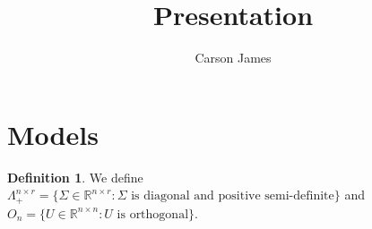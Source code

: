 \documentclass[notheorems]{beamer}
\title{Presentation}
\author{Carson James}
\theoremstyle{definition}
\newtheorem{defn}[definition]{Definition}
\newcommand{\Lam}{\Lambda}
\newcommand{\Sig}{\Sigma}
\newcommand{\R}{\mathbb{R}}
\begin{document}
\frame{\titlepage}


%	


\section{Models}

\begin{frame}
\begin{defn}
We define $\Lam^{n \times r}_+ = \{\Sig \in \R^{n \times r}: \Sig \text{ is diagonal and positive semi-definite}\}$ and $O_n = \{U \in \R^{n \times n}: U \text{ is orthogonal}\}$. 
\end{defn}
\end{frame}
\end{document}
